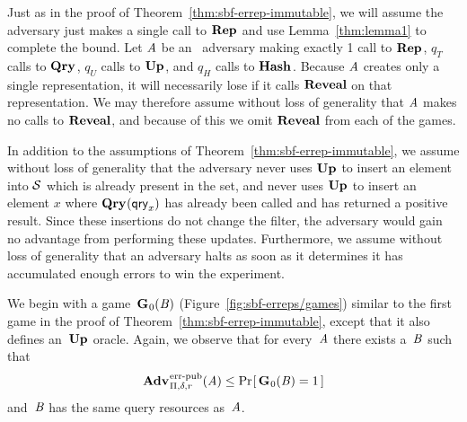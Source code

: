 %
%
Just as in the proof of Theorem~\ref{thm:sbf-errep-immutable}, we will assume
the adversary just makes a single call to $\textup{\textbf{Rep}}\hspace{0.5pt}$ and use Lemma~\ref{thm:lemma1}
to complete the bound. Let $\mathit{A}$ be an \erreps\ adversary making exactly 1
call to $\textup{\textbf{Rep}}\hspace{0.5pt}$, $q_T$ calls to $\textup{\textbf{Qry}}\hspace{0.5pt}$, $q_U$ calls to $\textup{\textbf{Up}}\hspace{0.5pt}$, and $q_H$ calls
to $\textup{\textbf{Hash}}\hspace{0.5pt}$. Because $\mathit{A}$ creates only a single representation, it will
necessarily lose if it calls $\mathbf{Reveal}$ on that representation. We may therefore
assume without loss of generality that $\mathit{A}$ makes no calls to $\mathbf{Reveal}$, and
because of this we omit $\mathbf{Reveal}$ from each of the games.
%

In addition to the assumptions of Theorem~\ref{thm:sbf-errep-immutable}, we
assume without loss of generality that the adversary never uses $\textup{\textbf{Up}}\hspace{0.5pt}$ to insert
an element into $\mathcal{S}$ which is already present in the set, and never uses
$\textup{\textbf{Up}}\hspace{0.5pt}$ to insert an element $x$ where $\textup{\textbf{Qry}}\hspace{0.5pt}(\mathsf{qry}_x)$ has already been called
and has returned a positive result. Since these insertions do not change the
filter, the adversary would gain no advantage from performing these updates.
Furthermore, we assume without loss of generality that an adversary halts as
soon as it determines it has accumulated enough errors to win the experiment.

We begin with a game~$\textup{\textbf{G}}\hspace{0.5pt}_0(\mathit{B})$
(Figure~\ref{fig:sbf-erreps/games}) similar to the first game in the
proof of Theorem~\ref{thm:sbf-errep-immutable}, except that it also defines
an~$\textup{\textbf{Up}}\hspace{0.5pt}$ oracle. Again, we observe that for every~$\mathit{A}$ there exists
a~$\mathit{B}$ such that
\begin{equation}
  \Adv{\errep}_{\Pi,\delta,r}(\advA) \leq \Prob{\game_0(\advB) = 1}
\end{equation}
and~$\mathit{B}$ has the same query resources as~$\mathit{A}$.

